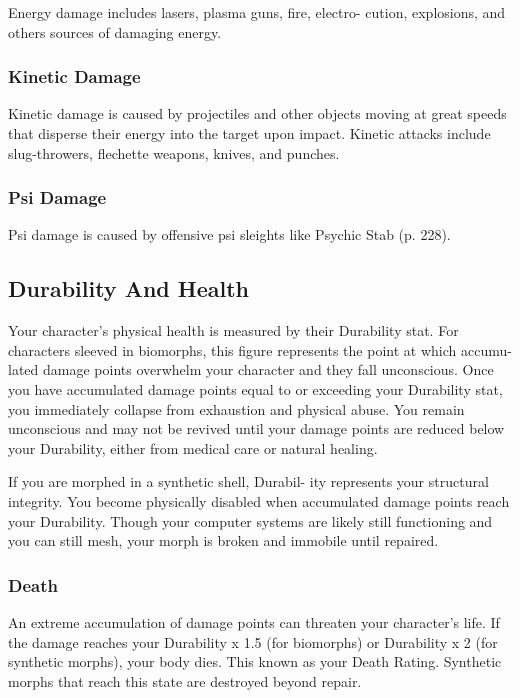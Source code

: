 Energy damage includes lasers, plasma guns, fire, electro-
cution, explosions, and others sources of damaging energy.

\subsubsection{Kinetic Damage}

Kinetic damage is caused by projectiles and other 
objects moving at great speeds that disperse their 
energy into the target upon impact. Kinetic attacks 
include slug-throwers, flechette weapons, knives, 
and punches.

\subsubsection{Psi Damage}

Psi damage is caused by offensive psi sleights like 
Psychic Stab (p. 228).

\subsection{Durability And Health}

Your character's physical health is measured by their 
Durability stat. For characters sleeved in biomorphs, 
this figure represents the point at which accumu-
lated damage points overwhelm your character and 
they fall unconscious. Once you have accumulated 
damage points equal to or exceeding your Durability 
stat, you immediately collapse from exhaustion and 
physical abuse. You remain unconscious and may 
not be revived until your damage points are reduced 
below your Durability, either from medical care or 
natural healing.

If you are morphed in a synthetic shell, Durabil-
ity represents your structural integrity. You become 
physically disabled when accumulated damage points 
reach your Durability. Though your computer systems 
are likely still functioning and you can still mesh, your 
morph is broken and immobile until repaired.

\subsubsection{Death}

An extreme accumulation of damage points can 
threaten your character's life. If the damage reaches 
your Durability x 1.5 (for biomorphs) or Durability x 
2 (for synthetic morphs), your body dies. This known 
as your Death Rating. Synthetic morphs that reach 
this state are destroyed beyond repair.

